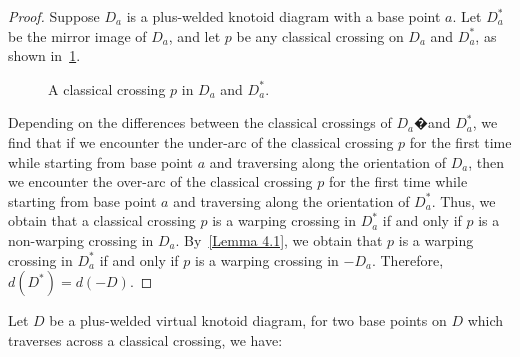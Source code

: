 \documentclass[11pt]{amsart}
\theoremstyle{noparens}
\numberwithin{equation}{section}
\numberwithin{equation}{section}
\begin{document}
\begin{proof}	
 Suppose $D_a$ is a plus-welded knotoid diagram with a base point $a$. Let $D_a^*$ be the mirror image of $D_a$, and let $p$ be any classical crossing on $D_a$ and $D_a^*$, as shown in~\cref{Figure 19}. 
 \begin{figure}[htbp]
\begin{center}
\caption{A classical crossing $p$ in $D_a$ and $D_a^*$.}
\label{Figure 19}
\end{center}
\end{figure}
 
 Depending on the differences between the classical crossings of $D_a$�and $D_a^*$, we find that if we encounter the under-arc of the classical crossing $p$ for the first time while starting from base point $a$ and traversing along the orientation of $D_a$, then we encounter the over-arc of the classical crossing $p$ for the first time while starting from base point $a$ and traversing along the orientation of $D_a^*$. Thus, we obtain that a classical crossing $p$ is a warping crossing in $D_a^*$ if and only if $p$ is a non-warping crossing in $D_a$. By~\cref{Lemma 4.1}, we obtain that $p$ is a warping crossing in $D_a^*$ if and only if $p$ is a warping crossing in $-D_a$. Therefore, $d(D^*) = d(-D)$.
\end{proof}
		
Let $D$ be a plus-welded virtual knotoid diagram, for two base points on $D$ which traverses across a classical crossing, we have: 
\end{document}
